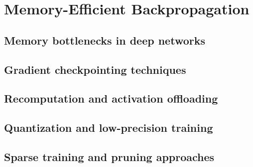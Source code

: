 \section{Memory-Efficient Backpropagation}
\subsection{Memory bottlenecks in deep networks}
\subsection{Gradient checkpointing techniques}
\subsection{Recomputation and activation offloading}
\subsection{Quantization and low-precision training}
\subsection{Sparse training and pruning approaches}

